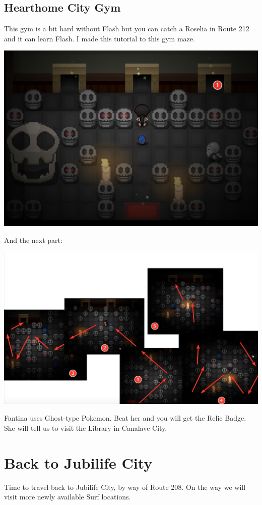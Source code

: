 \documentclass[11pt]{article}
\begin{document}
\subsection{Hearthome City Gym}\label{subsec:hearthome-city-gym}
This gym is a bit hard without Flash but you can catch a Roselia in Route 212
and it can learn Flash.
I made this tutorial to this gym maze.

\includegraphics[width=\textwidth]{walkthrough/Sinnoh/hearthome_gym_1}

And the next part:

\includegraphics[width=\textwidth]{walkthrough/Sinnoh/hearthome_gym_2}

Fantina uses Ghost-type Pokemon.
Beat her and you will get the Relic Badge.
She will tell us to visit the Library in Canalave City.

\section{Back to Jubilife City}\label{sec:back-to-jubilife-city}
Time to travel back to Jubilife City, by way of Route 208.
On the way we will visit more newly available Surf locations.
\end{document}

